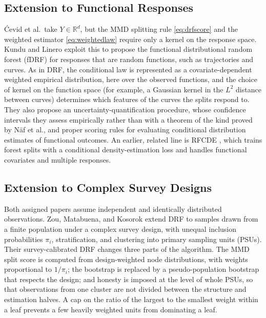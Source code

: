 \documentclass[12pt,a4paper]{article}
\newcommand{\R}{\mathbb R}
\newcommand{\1}{\mathbf 1}
\begin{document}
\subsection{Extension to Functional Responses}\label{sec:functional}
\'{C}evid et al.\ take $Y\in\R^d$, but the MMD splitting rule \eqref{eq:drfscore} and the weighted estimator \eqref{eq:weightedlaw} require only a kernel on the response space. Kundu and Linero \cite{kundulinero2026} exploit this to propose the functional distributional random forest (fDRF) for responses that are random functions, such as trajectories and curves. As in DRF, the conditional law is represented as a covariate-dependent weighted empirical distribution, here over the observed functions, and the choice of kernel on the function space (for example, a Gaussian kernel in the $L^2$ distance between curves) determines which features of the curves the splits respond to. They also propose an uncertainty-quantification procedure, whose confidence intervals they assess empirically rather than with a theorem of the kind proved by N\"af et al., and proper scoring rules for evaluating conditional distribution estimates of functional outcomes. An earlier, related line is RFCDE \cite{pospisil2019}, which trains forest splits with a conditional density-estimation loss and handles functional covariates and multiple responses.

\subsection{Extension to Complex Survey Designs}\label{sec:survey}
Both assigned papers assume independent and identically distributed observations. Zou, Matabuena, and Kosorok \cite{zou2025} extend DRF to samples drawn from a finite population under a complex survey design, with unequal inclusion probabilities $\pi_i$, stratification, and clustering into primary sampling units (PSUs). Their survey-calibrated DRF changes three parts of the algorithm. The MMD split score is computed from design-weighted node distributions, with weights proportional to $1/\pi_i$; the bootstrap is replaced by a pseudo-population bootstrap that respects the design; and honesty is imposed at the level of whole PSUs, so that observations from one cluster are not divided between the structure and estimation halves. A cap on the ratio of the largest to the smallest weight within a leaf prevents a few heavily weighted units from dominating a leaf.
\end{document}
